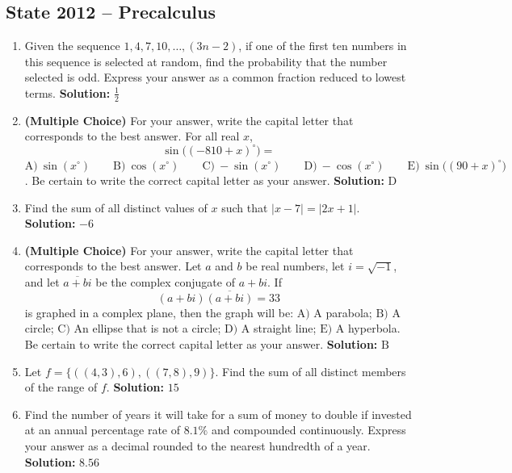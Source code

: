 \documentclass[10pt]{article}
\begin{document}
\subsection*{State 2012 -- Precalculus}
\begin{enumerate}
\item Given the sequence \(1,4,7,10,\ldots,(3n-2)\), if one of the first ten numbers in this sequence is selected at random, find the probability that the number selected is odd. Express your answer as a common fraction reduced to lowest terms. \quad\textbf{Solution:} \(\frac{1}{2}\)

\item \textbf{(Multiple Choice)} For your answer, write the capital letter that corresponds to the best answer. For all real \(x\),
\[
\sin\bigl((-810+x)^\circ\bigr)=
\]
\(\mathrm{A})\ \sin(x^\circ)\qquad
\mathrm{B})\ \cos(x^\circ)\qquad
\mathrm{C})\ -\sin(x^\circ)\qquad
\mathrm{D})\ -\cos(x^\circ)\qquad
\mathrm{E})\ \sin\bigl((90+x)^\circ\bigr)\).
Be certain to write the correct capital letter as your answer. \quad\textbf{Solution:} \(\mathrm{D}\)

\item Find the sum of all distinct values of \(x\) such that \(\lvert x-7\rvert=\lvert 2x+1\rvert\). \quad\textbf{Solution:} \(-6\)

\item \textbf{(Multiple Choice)} For your answer, write the capital letter that corresponds to the best answer. Let \(a\) and \(b\) be real numbers, let \(i=\sqrt{-1}\), and let \(\overline{a+bi}\) be the complex conjugate of \(a+bi\). If
\[
(a+bi)\overline{(a+bi)}=33
\]
is graphed in a complex plane, then the graph will be:
\(\mathrm{A})\) A parabola; \(\mathrm{B})\) A circle; \(\mathrm{C})\) An ellipse that is not a circle; \(\mathrm{D})\) A straight line; \(\mathrm{E})\) A hyperbola. Be certain to write the correct capital letter as your answer. \quad\textbf{Solution:} \(\mathrm{B}\)

\item Let \(f=\{((4,3),6),((7,8),9)\}\). Find the sum of all distinct members of the range of \(f\). \quad\textbf{Solution:} \(15\)

\item Find the number of years it will take for a sum of money to double if invested at an annual percentage rate of \(8.1\%\) and compounded continuously. Express your answer as a decimal rounded to the nearest hundredth of a year. \quad\textbf{Solution:} \(8.56\)


\end{enumerate}
\end{document}
